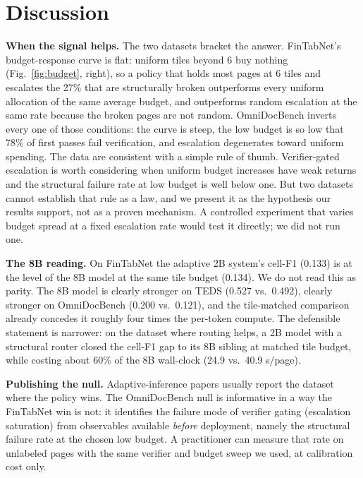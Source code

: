 \documentclass[conference]{IEEEtran}
\begin{document}
\section{Discussion}
\label{sec:discussion}

\textbf{When the signal helps.} The two datasets bracket the answer.
FinTabNet's budget-response curve is flat: uniform tiles beyond 6 buy
nothing (Fig.~\ref{fig:budget}, right), so a policy that holds most pages
at 6 tiles and escalates the 27\% that are structurally broken
outperforms every uniform allocation of the same average budget, and
outperforms random escalation at the same rate because the broken pages
are not random. OmniDocBench inverts every one of those conditions: the
curve is steep, the low budget is so low that 78\% of first passes fail
verification, and escalation degenerates toward uniform spending. The
data are consistent with a simple rule of thumb. Verifier-gated
escalation is worth considering when uniform budget increases have weak
returns and the structural failure rate at low budget is well below one.
But two datasets cannot establish that rule as a law, and we present
it as the hypothesis our results support, not as a proven mechanism. A
controlled experiment that varies budget spread at a fixed escalation
rate would test it directly; we did not run one.

\textbf{The 8B reading.} On FinTabNet the adaptive 2B system's cell-F1
(0.133) is at the level of the 8B model at the same tile budget (0.134).
We do not read this as parity. The 8B model is clearly stronger on TEDS
(0.527 vs.\ 0.492), clearly stronger on OmniDocBench (0.200 vs.\ 0.121),
and the tile-matched comparison already concedes it roughly four times
the per-token compute. The defensible statement is narrower: on the
dataset where routing helps, a 2B model with a structural router closed
the cell-F1 gap to its 8B sibling at matched tile budget, while costing
about 60\% of the 8B wall-clock (24.9 vs.\ 40.9 s/page).

\textbf{Publishing the null.} Adaptive-inference papers usually report
the dataset where the policy wins. The OmniDocBench null is informative
in a way the FinTabNet win is not: it identifies the failure mode of
verifier gating (escalation saturation) from observables available
\emph{before} deployment, namely the structural failure rate at the chosen
low budget. A practitioner can measure that rate on unlabeled pages with
the same verifier and budget sweep we used, at calibration cost only.
\end{document}
